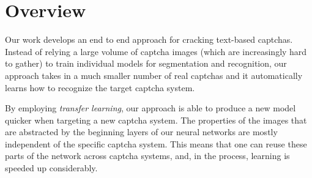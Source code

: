 \section{Overview}
Our work develops an end to end approach for cracking text-based captchas. Instead of relying a large volume of captcha images (which are
increasingly hard to gather) to train individual models for segmentation and recognition, our approach takes in a much smaller number of
real captchas and it automatically learns how to recognize the target captcha system.  


By employing \emph{transfer learning}, our approach is able to produce a new model quicker when targeting a new captcha system. The
properties of the images that are abstracted by the beginning layers of our neural networks are mostly independent of the specific captcha
system. This means that one can reuse these parts of the network across captcha systems, and, in the process, learning is speeded up
considerably.



